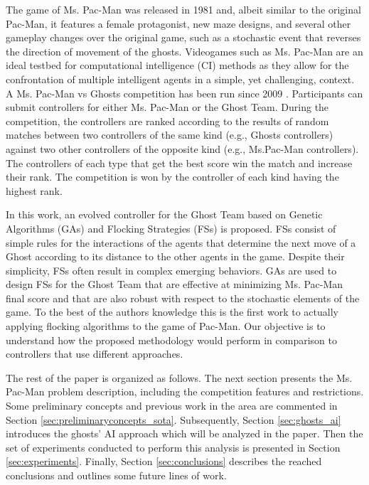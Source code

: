 \documentclass{llncs}
\begin{document}
The game of Ms. Pac-Man was released in 1981 and, albeit similar to the original Pac-Man, it features a female protagonist, new maze designs, and several other gameplay changes over the original game, such as a stochastic event that reverses the direction of movement of the ghosts. Videogames such as Ms. Pac-Man are an ideal testbed for computational intelligence (CI) methods as they allow for the confrontation of multiple intelligent agents in a simple, yet challenging, context. A Ms. Pac-Man vs Ghosts competition has been run since 2009 \cite{Lucas2009}. Participants can submit controllers for either Ms. Pac-Man or the Ghost Team. During the competition, the controllers are ranked according to the results of random matches between two controllers of the same kind (e.g., Ghosts controllers) against two other controllers of the opposite kind (e.g., Ms.Pac-Man controllers). The controllers of each type that get the best score win the match and increase their rank. The competition is won by the controller of each kind having the highest rank.

In this work, an evolved controller for the Ghost Team based on Genetic Algorithms (GAs) and Flocking Strategies (FSs) is proposed. FSs \cite{Reynolds87} consist of simple rules for the interactions of the agents that determine the next move of a Ghost according to its distance to the other agents in the game. Despite their simplicity, FSs often result in complex emerging behaviors. GAs are used to design FSs for the Ghost Team that are effective at minimizing Ms. Pac-Man final score and that are also robust with respect to the stochastic elements of the game. To the best of the authors knowledge this is the first work to actually applying flocking algorithms to the game of Pac-Man. Our objective is to understand how the proposed methodology would perform in comparison to controllers that use different approaches.

The rest of the paper is organized as follows. The next section presents the Ms. Pac-Man problem description, including the competition features and restrictions. Some preliminary concepts and previous work in the area are commented in Section \ref{sec:preliminaryconcepts_sota}. Subsequently, Section \ref{sec:ghosts_ai} introduces the ghosts' AI approach which will be analyzed in the paper. Then the set of experiments conducted to perform this analysis is presented in Section \ref{sec:experiments}. Finally, Section \ref{sec:conclusions} describes the reached conclusions and outlines some future lines of work.
\end{document}
